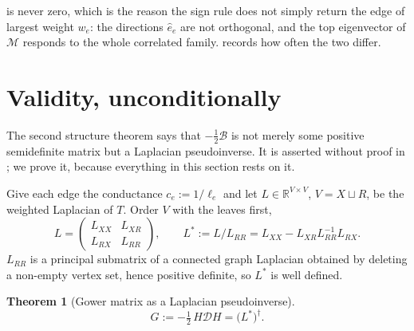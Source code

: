 \documentclass[11pt]{article}
\theoremstyle{plain}
\newtheorem{theorem}{Theorem}
\theoremstyle{definition}
\theoremstyle{remark}
\providecommand{\Dmat}{\mathcal{D}}          %
\providecommand{\Bop}{\mathcal{B}}           %
\providecommand{\Mop}{\mathcal{M}}           %
\providecommand{\1}{\mathbf{1}}
\providecommand{\R}{\mathbb{R}}
\newcommand{\ehat}{\hat{e}}
\begin{document}
 is never zero, which is the reason the sign rule does not
simply return the edge of largest weight $w_e$: the directions $\ehat_e$ are not
orthogonal, and the top eigenvector of $\Mop$ responds to the whole correlated
family.  records how often the two differ.

\section{Validity, unconditionally}\label{d:sec:validity}

The second structure theorem says that $-\tfrac12\Bop$ is not merely some
positive semidefinite matrix but a Laplacian pseudoinverse. It is asserted
without proof in \cite[\S4.4, \S4.8.1]{griffing2012connections}; we prove it,
because everything in this section rests on it.

Give each edge the conductance $c_e:=1/\ell_e$ and let $L\in\R^{V\times V}$,
$V=X\sqcup R$, be the weighted Laplacian of $T$. Order $V$ with the leaves
first,
\begin{equation}\label{d:eq:block}
  L=\begin{pmatrix} L_{XX} & L_{XR}\\ L_{RX} & L_{RR}\end{pmatrix},
  \qquad
  L^{*}:=L/L_{RR}=L_{XX}-L_{XR}L_{RR}^{-1}L_{RX}.
\end{equation}
$L_{RR}$ is a principal submatrix of a connected graph Laplacian obtained by
deleting a non-empty vertex set, hence positive definite, so $L^{*}$ is
well defined.

\begin{theorem}[Gower matrix as a Laplacian pseudoinverse]\label{d:thm:pinv}
\begin{equation}\label{d:eq:pinv}
  G:=-\tfrac12\,H\Dmat H=\bigl(L^{*}\bigr)^{\dagger}.
\end{equation}
\end{theorem}
\end{document}
